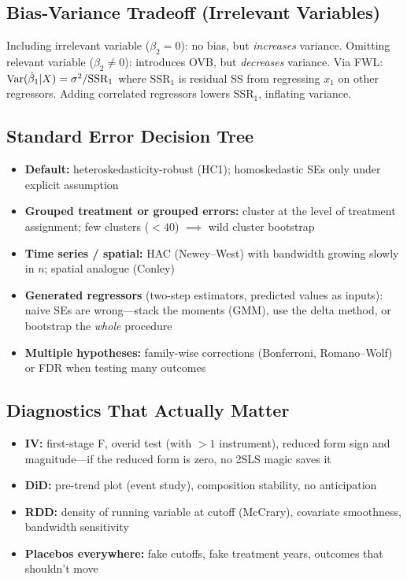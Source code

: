 \subsection{Bias-Variance Tradeoff (Irrelevant Variables)}
Including irrelevant variable ($\beta_2\!=\!0$): no bias, but \emph{increases} variance. Omitting relevant variable ($\beta_2\!\neq\! 0$): introduces OVB, but \emph{decreases} variance.
Via FWL: $\text{Var}(\hat\beta_1|X) = \sigma^2/\text{SSR}_1$ where $\text{SSR}_1$ is residual SS from regressing $x_1$ on other regressors. Adding correlated regressors lowers $\text{SSR}_1$, inflating variance.

\subsection{Standard Error Decision Tree}
\begin{itemize}[nosep]
    \item \textbf{Default:} heteroskedasticity-robust (HC1); homoskedastic SEs only under explicit assumption
    \item \textbf{Grouped treatment or grouped errors:} cluster at the level of treatment assignment; few clusters ($<40$) $\implies$ wild cluster bootstrap
    \item \textbf{Time series / spatial:} HAC (Newey--West) with bandwidth growing slowly in $n$; spatial analogue (Conley)
    \item \textbf{Generated regressors} (two-step estimators, predicted values as inputs): naive SEs are wrong---stack the moments (GMM), use the delta method, or bootstrap the \textit{whole} procedure
    \item \textbf{Multiple hypotheses:} family-wise corrections (Bonferroni, Romano--Wolf) or FDR when testing many outcomes
\end{itemize}

\subsection{Diagnostics That Actually Matter}
\begin{itemize}[nosep]
    \item \textbf{IV:} first-stage F, overid test (with $>1$ instrument), reduced form sign and magnitude---if the reduced form is zero, no 2SLS magic saves it
    \item \textbf{DiD:} pre-trend plot (event study), composition stability, no anticipation
    \item \textbf{RDD:} density of running variable at cutoff (McCrary), covariate smoothness, bandwidth sensitivity
    \item \textbf{Placebos everywhere:} fake cutoffs, fake treatment years, outcomes that shouldn't move
\end{itemize}
